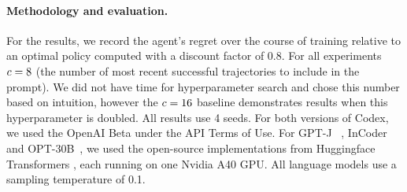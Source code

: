 \documentclass{article}
\begin{document}
\paragraph{Methodology and evaluation.}
\label{para:methodology}
For the results, we record the agent's regret over the course of training
relative to an optimal policy computed with a discount factor of 0.8. For all
experiments $c = 8$ (the number of most recent successful
trajectories to include in the prompt). We did not have time for hyperparameter
search and chose this number based on intuition, however the $c =
  16$ baseline demonstrates results when this hyperparameter is doubled. All
results use 4 seeds.
For both versions of Codex, we used the OpenAI Beta under the API Terms of Use.
For GPT-J~\parencite{wang_gpt-j-6b_2021} , InCoder~\parencite{fried_incoder_2022} and
OPT-30B~\parencite{zhang_opt_2022}, we used the open-source implementations from
Huggingface Transformers \parencite{wolf_transformers_2020}, each running on one
Nvidia A40 GPU. All language models use a sampling temperature of 0.1.
\end{document}
